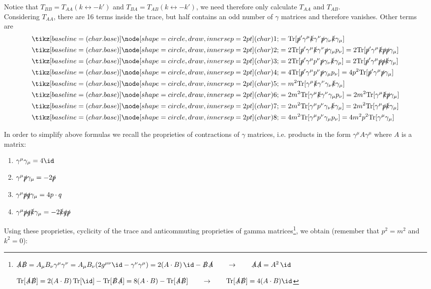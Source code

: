 \documentclass[TheoreticalPhy_ModB.tex]{subfiles}
\begin{document}
Notice that $T_{BB}=T_{AA}(k\leftrightarrow -k')$ and $T_{BA}=T_{AB}(k\leftrightarrow -k')$, we need therefore only calculate $T_{AA}$ and $T_{AB}$.\\
Considering $T_{AA}$, there are 16 terms inside the trace, but half contains an odd number of $\gamma$ matrices and therefore vanishes. Other terms are
\begin{align*}
\circled 1&=\Tr[\slashed p'\gamma^\mu\slashed k\gamma^\nu\slashed p\gamma_\nu\slashed k\gamma_\mu]\\
\circled 2&=2\Tr[\slashed p'\gamma^\mu\slashed k\gamma^\nu\slashed p\gamma_\mu p_\nu]
=2\Tr[\slashed p'\gamma^\mu\slashed k\slashed p\slashed p\gamma_\mu]\\
\circled 3&=2\Tr[\slashed p'\gamma^\mu p^\nu\slashed p\gamma_\nu\slashed k\gamma_\mu]
=2\Tr[\slashed p'\gamma^\mu \slashed p\slashed p\slashed k\gamma_\mu]\\
\circled 4&=4\Tr[\slashed p'\gamma^\mu p^\nu\slashed p\gamma_\mu p_\nu]
=4p^2\Tr[\slashed p'\gamma^\mu \slashed p\gamma_\mu]\\
\circled 5&=m^2\Tr[\gamma^\mu\slashed k\gamma^\nu\gamma_\nu\slashed k\gamma_\mu]\\
\circled 6&=2m^2\Tr[\gamma^\mu\slashed k\gamma^\nu\gamma_\mu p_\nu]
=2m^2\Tr[\gamma^\mu\slashed k\slashed p\gamma_\mu]\\
\circled 7&=2m^2\Tr[\gamma^\mu p^\nu\gamma_\nu\slashed k\gamma_\mu]
=2m^2\Tr[\gamma^\mu \slashed p\slashed k\gamma_\mu]\\
\circled 8&=4m^2\Tr[\gamma^\mu p^\nu\gamma_\mu p_\nu]
=4m^2p^2\Tr[\gamma^\mu \gamma_\mu ]\\
\end{align*}

In order to simplify above formulas we recall the proprieties of contractions of $\gamma$ matrices, i.e. products in the form $\gamma^\mu A\gamma^\mu$ where $A$ is a matrix:

\begin{enumerate}
\item $\gamma^\mu\gamma_\mu=4\id$
\item $\gamma^\mu\slashed p\gamma_\mu=-2\slashed p$
\item $\gamma^\mu\slashed p\slashed q\gamma_\mu=4p\cdot q$
\item $\gamma^\mu\slashed p\slashed q\slashed k\gamma_\mu=-2\slashed k\slashed q\slashed p$
\end{enumerate}

Using these proprieties, cyclicity of the trace and anticommuting proprieties of gamma matrices\footnote{$\slashed A\slashed B=A_\mu B_\nu\gamma^\mu\gamma^\nu=A_\mu B_\nu(2g^{\mu\nu}\id-\gamma^\nu\gamma^\mu)=2(A\cdot B)\,\id-\slashed B\slashed A\qquad\rightarrow\qquad\slashed A\slashed A=A^2\,\id$

$\Tr[\slashed A\slashed B]=2(A\cdot B)\,\Tr[\id]-\Tr[\slashed B\slashed A]=8(A\cdot B)-\Tr[\slashed A\slashed B]\qquad\rightarrow\qquad\Tr[\slashed A\slashed B]=4(A\cdot B)\id$}, we obtain (remember that $p^2=m^2$ and $k^2=0$):
\end{document}
